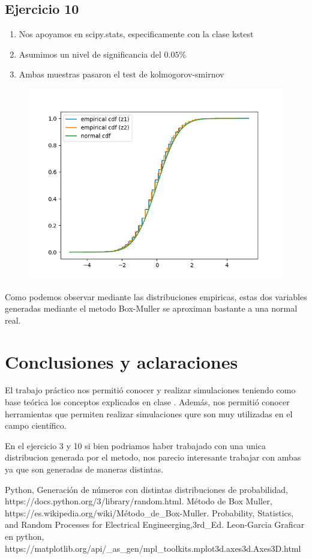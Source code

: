 \documentclass[11pt,a4paper]{article}
\begin{document}
	\subsection{Ejercicio 10}
	\begin{enumerate}
		\item Nos apoyamos en scipy.stats, especificamente con la clase kstest
		\item Asumimos un nivel de significancia del $0.05$\%
		\item Ambas muestras pasaron el test de kolmogorov-smirnov
	\end{enumerate}
	\begin{figure}[H]
  		\centering
    		\includegraphics[width=14cm]{imagenes/10}
	\end{figure}
	Como podemos observar mediante las distribuciones empiricas, estas dos variables generadas mediante el metodo Box-Muller se aproximan bastante a una normal real.

\newpage
\section{Conclusiones y aclaraciones}
El trabajo práctico nos permitió conocer y realizar simulaciones teniendo como base teórica los conceptos explicados en clase . Además, nos permitió conocer herramientas que permiten realizar simulaciones qure son muy utilizadas en el campo científico.

En el ejercicio 3 y 10 si bien podriamos haber trabajado con una unica distribucion generada por el metodo, nos parecio interesante trabajar con ambas ya que son generadas de maneras distintas.
\begin{thebibliography}{10}
	\bibitem{} Python, Generación de números con distintas distribuciones de probabilidad, https://docs.python.org/3/library/random.html.
	\bibitem{} Método de Box Muller, https://es.wikipedia.org/wiki/Método\_de\_Box-Muller.
	\bibitem{} Probability, Statistics, and Random Processes for Electrical Engineerging,3rd\_Ed. Leon-Garcia
	\bibitem{} Graficar en python, https://matplotlib.org/api/\_as\_gen/mpl\_toolkits.mplot3d.axes3d.Axes3D.html
\end{thebibliography}
\end{document}
